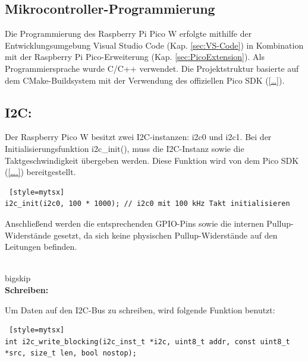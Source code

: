 \begin{inhalt}
\renewcommand*\chapterpagestyle{scrheadings}

\chapter{Mikrocontroller-Programmierung}

Die Programmierung des Raspberry Pi Pico W erfolgte mithilfe der Entwicklungsumgebung Visual Studio Code (Kap. \ref{sec:VS-Code}) in Kombination mit der Raspberry Pi Pico-Erweiterung (Kap. \ref{sec:PicoExtension}). Als Programmiersprache wurde C/C++ verwendet. Die Projektstruktur basierte auf dem CMake-Buildsystem mit der Verwendung des offiziellen Pico SDK (\ref{…}). 

\section{I2C:} \label{I2C_Programmierung}

Der Raspberry Pico W besitzt zwei I2C-instanzen: i2c0 und i2c1. Bei der Initialisierungsfunktion i2c\_init(), muss die I2C-Instanz sowie die Taktgeschwindigkeit übergeben werden. Diese Funktion wird von dem Pico SDK (\ref{….}) bereitgestellt. 

\begin{lstlisting} [style=mytsx]
i2c_init(i2c0, 100 * 1000); // i2c0 mit 100 kHz Takt initialisieren
\end{lstlisting}


Anschließend werden die entsprechenden GPIO-Pins sowie die internen Pullup-Widerstände gesetzt, da sich keine physischen Pullup-Widerstände auf den Leitungen befinden. 

\\bigskip \\


\textbf{Schreiben:}

Um Daten auf den I2C-Bus zu schreiben, wird folgende Funktion benutzt:

\begin{lstlisting} [style=mytsx]
int i2c_write_blocking(i2c_inst_t *i2c, uint8_t addr, const uint8_t *src, size_t len, bool nostop);
\end{lstlisting}


\end{inhalt}
